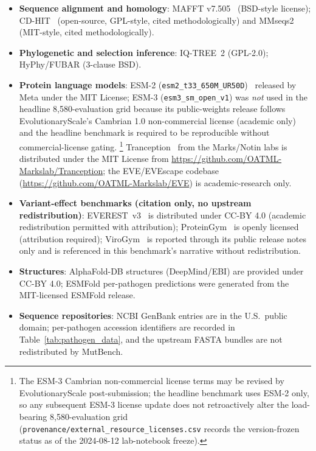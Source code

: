 \begin{itemize}[leftmargin=*,itemsep=0pt]
\item \textbf{Sequence alignment and homology}: MAFFT v7.505~\cite{katoh2013mafft} (BSD-style license); CD-HIT~\cite{fu2012cdhit} (open-source, GPL-style, cited methodologically) and MMseqs2~\cite{steinegger2017mmseqs2} (MIT-style, cited methodologically).
\item \textbf{Phylogenetic and selection inference}: IQ-TREE~2 (GPL-2.0); HyPhy/FUBAR (3-clause BSD).
\item \textbf{Protein language models}: ESM-2 (\texttt{esm2\_t33\_650M\_UR50D})~\cite{lin2023esm2} released by Meta under the MIT License; ESM-3 (\texttt{esm3\_sm\_open\_v1}) was \emph{not} used in the headline 8{,}580-evaluation grid because its public-weights release follows EvolutionaryScale's Cambrian 1.0 non-commercial license (academic only) and the headline benchmark is required to be reproducible without commercial-license gating.%
\footnote{The ESM-3 Cambrian non-commercial license terms may be revised by EvolutionaryScale post-submission; the headline benchmark uses ESM-2 only, so any subsequent ESM-3 license update does not retroactively alter the load-bearing 8{,}580-evaluation grid (\texttt{provenance/external\_resource\_licenses.csv} records the version-frozen status as of the 2024-08-12 lab-notebook freeze).}
Tranception~\cite{notin2022tranception} from the Marks/Notin labs is distributed under the MIT License from \url{https://github.com/OATML-Markslab/Tranception}; the EVE/EVEscape codebase~\cite{frazer2021eve,thadani2023evescape} (\url{https://github.com/OATML-Markslab/EVE}) is academic-research only.
\item \textbf{Variant-effect benchmarks (citation only, no upstream redistribution)}: EVEREST~v3~\cite{gurev2026everest_v3} is distributed under CC-BY 4.0 (academic redistribution permitted with attribution); ProteinGym~\cite{notin2025proteingym_v13} is openly licensed (attribution required); ViroGym~\cite{virogym2026} is reported through its public release notes only and is referenced in this benchmark's narrative without redistribution.
\item \textbf{Structures}: AlphaFold-DB structures (DeepMind/EBI) are provided under CC-BY 4.0; ESMFold per-pathogen predictions were generated from the MIT-licensed ESMFold release.
\item \textbf{Sequence repositories}: NCBI GenBank entries are in the U.S.\ public domain; per-pathogen accession identifiers are recorded in Table~\ref{tab:pathogen_data}, and the upstream FASTA bundles are not redistributed by MutBench.

\end{itemize}
